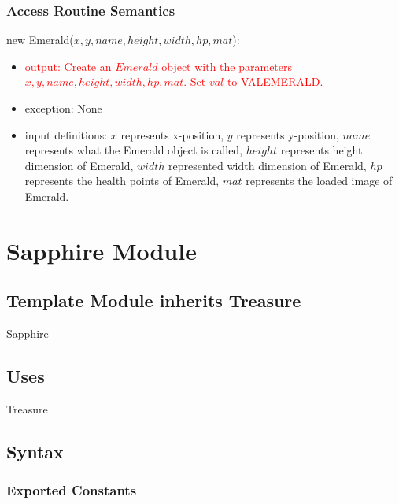 \documentclass[12pt]{article}
\newcommand{\m}[1]{\mbox{#1}}
\begin{document}
\subsubsection*{Access Routine Semantics}

new Emerald($x, y, name, height, width, hp, mat$):
\begin{itemize}
    \item \textcolor{red}{output: Create an $Emerald$ object with the parameters $x, y, name, height, width, hp, mat$. Set $val$ to VALEMERALD.}
    \item exception: None
    \item input definitions: $x$ represents x-position, $y$ represents y-position, $name$ represents what the Emerald object is called, $height$ represents height dimension of Emerald, $width$ represented width dimension of Emerald, $hp$ represents the health points of Emerald, $mat$ represents the loaded image of Emerald.
\end{itemize}

\newpage

\section*{Sapphire Module}

\subsection*{Template Module inherits Treasure}

Sapphire

\subsection*{Uses}

Treasure

\subsection*{Syntax}

\subsubsection*{Exported Constants}
\end{document}
